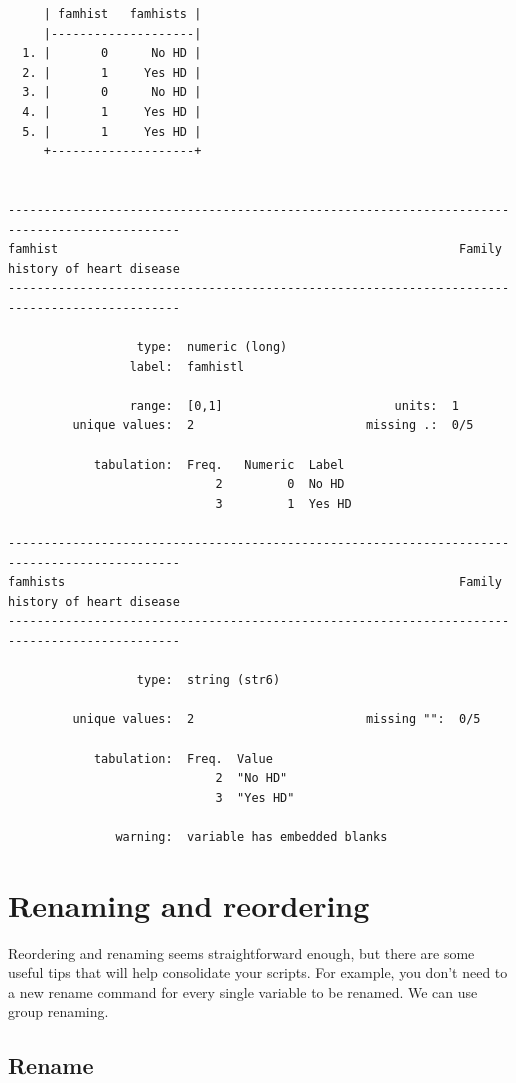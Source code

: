 \documentclass[
]{book}
\begin{document}
\begin{verbatim}
     | famhist   famhists |
     |--------------------|
  1. |       0      No HD |
  2. |       1     Yes HD |
  3. |       0      No HD |
  4. |       1     Yes HD |
  5. |       1     Yes HD |
     +--------------------+


----------------------------------------------------------------------------------------------
famhist                                                        Family history of heart disease
----------------------------------------------------------------------------------------------

                  type:  numeric (long)
                 label:  famhistl

                 range:  [0,1]                        units:  1
         unique values:  2                        missing .:  0/5

            tabulation:  Freq.   Numeric  Label
                             2         0  No HD
                             3         1  Yes HD

----------------------------------------------------------------------------------------------
famhists                                                       Family history of heart disease
----------------------------------------------------------------------------------------------

                  type:  string (str6)

         unique values:  2                        missing "":  0/5

            tabulation:  Freq.  Value
                             2  "No HD"
                             3  "Yes HD"

               warning:  variable has embedded blanks
\end{verbatim}

\section{Renaming and reordering}\label{renaming-and-reordering}

Reordering and renaming seems straightforward enough, but there are some useful tips that will help consolidate your scripts. For example, you don't need to a new rename command for every single variable to be renamed. We can use group renaming.

\subsection{Rename}\label{rename}
\end{document}
